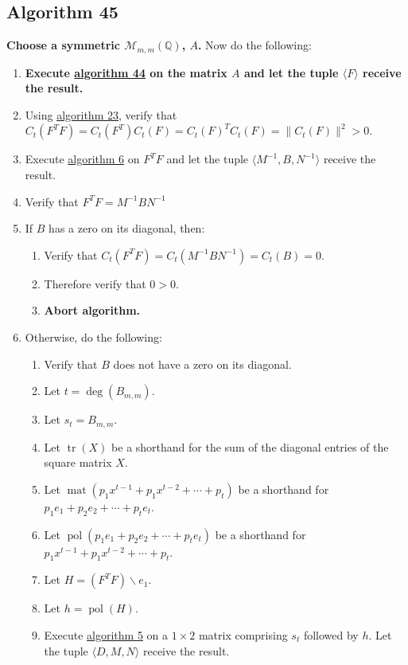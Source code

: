 \documentclass[twocolumn]{article}
\DeclareMathOperator{\mat}{mat}
\DeclareMathOperator{\pol}{pol}
\DeclareMathOperator{\tr}{tr}
\begin{document}
		\subsection{Algorithm 45}\label{sec:algorithm 45}
			\textbf{Choose a symmetric $\mathcal{M}_{m,m}(\mathbb{Q})$, $A$.} Now do the following:
			\begin{enumerate}
				\item \textbf{Execute \hyperref[sec:algorithm 44]{algorithm 44} on the matrix $A$ and let the tuple $\langle F\rangle$ receive the result.}
				\item Using \hyperref[sec:algorithm 23]{algorithm 23}, verify that $C_t(F^TF)=C_t(F^T)C_t(F)={C_t(F)}^TC_t(F)=\lVert C_t(F)\rVert^2>0$.
				\item Execute \hyperref[sec:algorithm 6]{algorithm 6} on $F^TF$ and let the tuple $\langle M^{-1},B,N^{-1}\rangle$ receive the result.
				\item Verify that $F^TF=M^{-1}BN^{-1}$
				\item If $B$ has a zero on its diagonal, then:
				\begin{enumerate}
					\item Verify that $C_t(F^TF)=C_t(M^{-1}BN^{-1})=C_t(B)=0$.
					\item Therefore verify that $0>0$.
					\item \textbf{Abort algorithm.}
				\end{enumerate}
				\item Otherwise, do the following:
				\begin{enumerate}
					\item Verify that $B$ does not have a zero on its diagonal.
					\item Let $t=\deg(B_{m,m})$.
					\item Let $s_t=B_{m,m}$.
					\item Let $\tr(X)$ be a shorthand for the sum of the diagonal entries of the square matrix $X$.
					\item Let $\mat(p_1x^{t-1}+p_1x^{t-2}+\cdots+p_t)$ be a shorthand for $p_1e_1+p_2e_2+\cdots+p_te_t$.
					\item Let $\pol(p_1e_1+p_2e_2+\cdots+p_te_t)$ be a shorthand for $p_1x^{t-1}+p_1x^{t-2}+\cdots+p_t$.
					\item Let $H=(F^TF)\backslash e_1$.
					\item Let $h=\pol(H)$.
					\item Execute \hyperref[sec:algorithm 5]{algorithm 5} on a $1\times 2$ matrix comprising $s_t$ followed by $h$. Let the tuple $\langle D,M,N\rangle$ receive the result.

\end{enumerate}
\end{enumerate}
\end{document}
